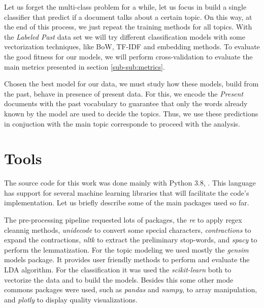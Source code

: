 Let us forget the multi-class problem for a while, let us focus in build a single classifier that predict if a document talks about a certain topic. On this way, at the end of this process, we just repeat the training methods for all topics. With the \textit{Labeled Past} data set we will try different classification models with some vectorization techniques, like BoW, TF-IDF and embedding methods. To evaluate the good fitness for our models, we will perform cross-validation to evaluate the main metrics presented in section \ref{sub-sub:metrics}.

Chosen the best model for our data, we must study how these models, build from the past, behave in presence of present data. For this, we encode the \textit{Present} documents with the past vocabulary to guarantee that only the words already known by the model are used to decide the topics. Thus, we use these predictions in conjuction with the main topic corresponde to proceed with the analysis.

\section{Tools}

The source code for this work was done mainly with Python 3.8, \cite{python}. This language has support for several machine learning libraries that will facilitate the code's implementation. Let us briefly describe some of the main packages used so far.

The pre-processing pipeline requested lots of packages, the \textit{re} to apply regex cleannig methods, \textit{unidecode} to convert some special characters, \textit{contractions} to expand the contractions, \textit{nltk} to extract the preliminary stop-words, and \textit{spacy} to perform the lemmatization. For the topic modeling we used mostly the \textit{gensim} models package. It provides user friendly methods to perform and evaluate the LDA algorithm. For the classification it was used the \textit{scikit-learn} both to vectorize the data and to build the models. Besides this some other mode commons packages were used, such as \textit{pandas} and \textit{numpy}, to array manipulation, and \textit{plotly} to display quality visualizations.

%
%

